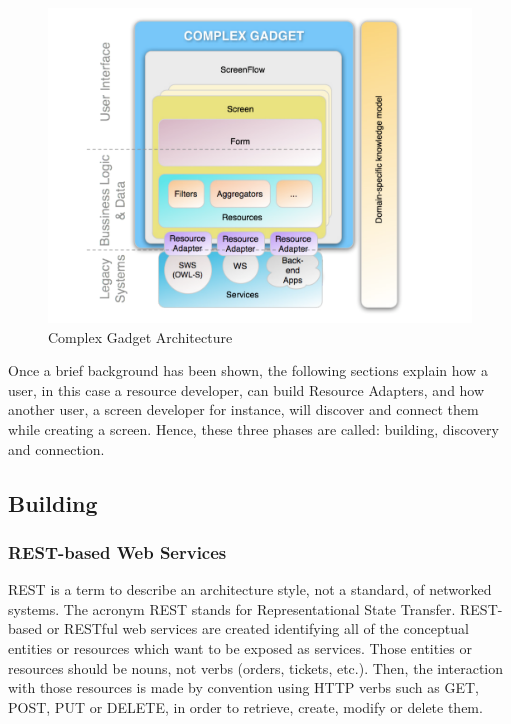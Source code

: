\documentclass{article}
\begin{document}
\begin{figure}
  \begin{center}
    \includegraphics[width=\linewidth]{images/ComplexGadgetArchitecture.pdf}
    \caption{Complex Gadget Architecture}
    \label{fig:complex_gadget_architecture}
  \end{center}
\end{figure}

Once a brief background has been shown, the following sections explain how a user, in this case a resource developer, can build Resource Adapters, and how another user, a screen developer for instance, will discover and connect them while creating a screen. Hence, these three phases are called: building, discovery and connection.

\subsection{Building} %
\label{sub:building}

\subsubsection{REST-based Web Services} %
\label{ssub:rest_based_web_services}

REST is a term to describe an architecture style, not a standard, of networked systems. The acronym REST stands for Representational State Transfer. REST-based or RESTful web services \cite{Fielding2000} are created identifying all of the conceptual entities or resources which want to be exposed as services. Those entities or resources should be nouns, not verbs (orders, tickets, etc.). Then, the interaction with those resources is made by convention using HTTP verbs such as GET, POST, PUT or DELETE, in order to retrieve, create, modify or delete them.
\end{document}
